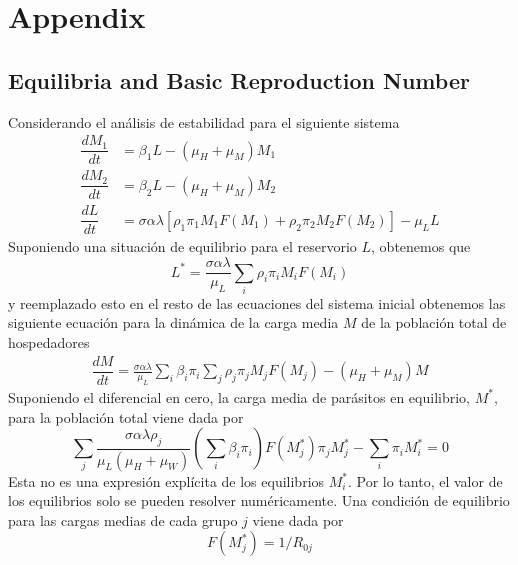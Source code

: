 \documentclass[12pt,a4paper]{article}
\theoremstyle{plain}%
\theoremstyle{definition}
\theoremstyle{remark}
\begin{document}
	
	\appendix
	\section{Appendix}
	\subsection{Equilibria and Basic Reproduction Number}\label{subsec:apendice-model1}
	Considerando el análisis de estabilidad para el siguiente sistema 
	\begin{equation}
	\begin{split}
	\dfrac{dM_1}{dt}&=\beta_1 L - (\mu_H+\mu_M) M_1\\%
	\dfrac{d M_2}{dt}&=\beta_2 L - (\mu_{H}+\mu_M) M_2\\
	\dfrac{dL}{dt}&=\sigma \alpha \lambda \left[ \rho_1 \pi_1 M_1 F(M_1)+ \rho_2 \pi_2 M_2 F(M_2) \right]   - \mu_L L 
	\end{split}
	\end{equation} 
	Suponiendo una situación de equilibrio para el reservorio $L$, obtenemos que 
	\begin{equation}
	L^*=\frac{ \sigma \alpha \lambda}{\mu_L}  \sum_i  \rho_i \pi_i M_i F(M_i) 
	\end{equation} 
	y reemplazado esto en el resto de las ecuaciones del sistema inicial obtenemos las siguiente ecuación para la dinámica de la carga media $M$ de la población total de hospedadores 
	\begin{equation}
	\begin{split}
	\dfrac{dM}{dt}=  \frac{ \sigma \alpha \lambda}{\mu_L} \sum_i \beta_i \pi_i \sum_j  \rho_j \pi_j M_j F(M_j)  -(\mu_{H}+\mu_M) M%
	\end{split}
	\end{equation}
	Suponiendo el diferencial en cero, la carga media de parásitos en equilibrio, $M^*$, para la población total
	viene dada por
	\begin{equation}
	\sum_j \frac{ \sigma \alpha \lambda \rho_j}{\mu_L(\mu_{H}+\mu_W)} \left( \sum_i \beta_i  \pi_i \right) F(M^*_j) \pi_j M^*_j - \sum_i  \pi_i M^*_i=0 
	\end{equation}
	Esta no es una expresión explícita de los equilibrios $M_i^*$. Por lo tanto, el valor de los equilibrios solo se pueden resolver numéricamente. 
	Una condición de equilibrio para las cargas medias de cada grupo $j$ viene dada por 
	\begin{equation}\label{eqequilibrio}
	F(M^*_j)=1/R_{0j}
	\end{equation}
\end{document}

